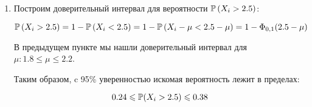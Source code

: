 \begin{problem}
\begin{sol}
\begin{enumerate}
\item Построим доверительный интервал для вероятности $\P\left( X_i>2.5\right)$:

\[\P\left( X_i>2.5\right) = 1 - \P\left( X_i<2.5\right)  = 1 - \P\left(X_i-\mu < 2.5-\mu \right) = 1 - \Phi_{0,1}(2.5-\mu)\]

В предыдущем пункте мы нашли доверительный интервал для $\mu: 1.8 \leqslant \mu \leqslant 2.2$.

Таким образом, c 95\% уверенностью искомая вероятность лежит в пределах:

\[0.24 \leqslant \P(X_i>2.5) \leqslant 0.38\]
\end{enumerate}
\end{sol}
\end{problem}



